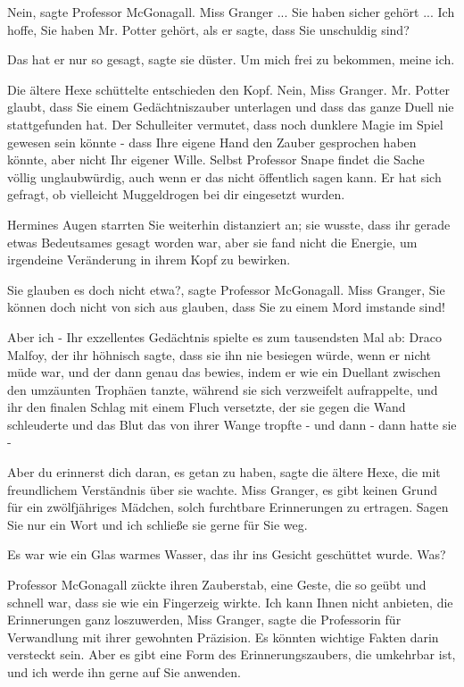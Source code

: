 \glqq{}Nein\grqq{}, sagte Professor McGonagall. \glqq{}Miss Granger ... Sie haben
sicher gehört ... Ich hoffe, Sie haben Mr. Potter gehört, als er sagte, dass Sie
unschuldig sind?\grqq{}

\glqq{}Das hat er nur so gesagt\grqq{}, sagte sie düster. \glqq{}Um mich frei zu
bekommen, meine ich.\grqq{}

Die ältere Hexe schüttelte entschieden den Kopf. \glqq{}Nein, Miss Granger. Mr.
Potter glaubt, dass Sie einem Gedächtniszauber unterlagen und dass das ganze
Duell nie stattgefunden hat. Der Schulleiter vermutet, dass noch dunklere Magie
im Spiel gewesen sein könnte - dass Ihre eigene Hand den Zauber gesprochen haben
könnte, aber nicht Ihr eigener Wille. Selbst Professor Snape findet die Sache
völlig unglaubwürdig, auch wenn er das nicht öffentlich sagen kann. Er hat sich
gefragt, ob vielleicht Muggeldrogen bei dir eingesetzt wurden.\grqq{}

Hermines Augen starrten Sie weiterhin distanziert an; sie wusste, dass ihr
gerade etwas Bedeutsames gesagt worden war, aber sie fand nicht die Energie, um
irgendeine Veränderung in ihrem Kopf zu bewirken.

\glqq{}Sie glauben es doch nicht etwa?\grqq{}, sagte Professor McGonagall. \glqq{}
Miss Granger, Sie können doch nicht von sich aus glauben, dass Sie zu einem Mord
imstande sind!\grqq{}

\glqq{}Aber ich -\grqq{} Ihr exzellentes Gedächtnis spielte es zum tausendsten
Mal ab: Draco Malfoy, der ihr höhnisch sagte, dass sie ihn nie besiegen würde,
wenn er nicht müde war, und der dann genau das bewies, indem er wie ein Duellant
zwischen den umzäunten Trophäen tanzte, während sie sich verzweifelt
aufrappelte, und ihr den finalen Schlag mit einem Fluch versetzte, der sie gegen
die Wand schleuderte und das Blut das von ihrer Wange tropfte - und dann - dann
hatte sie -

\glqq{}Aber du erinnerst dich daran, es getan zu haben\grqq{}, sagte die ältere
Hexe, die mit freundlichem Verständnis über sie wachte. \glqq{}Miss Granger, es
gibt keinen Grund für ein zwölfjähriges Mädchen, solch furchtbare Erinnerungen
zu ertragen. Sagen Sie nur ein Wort und ich schließe sie gerne für Sie
weg.\grqq{}

Es war wie ein Glas warmes Wasser, das ihr ins Gesicht geschüttet wurde. \glqq{}
Was?\grqq{}

Professor McGonagall zückte ihren Zauberstab, eine Geste, die so geübt und
schnell war, dass sie wie ein Fingerzeig wirkte. \glqq{}Ich kann Ihnen nicht
anbieten, die Erinnerungen ganz loszuwerden, Miss Granger\grqq{}, sagte die
Professorin für Verwandlung mit ihrer gewohnten Präzision. \glqq{}Es könnten
wichtige Fakten darin versteckt sein. Aber es gibt eine Form des
Erinnerungszaubers, die umkehrbar ist, und ich werde ihn gerne auf Sie
anwenden.\grqq{}

